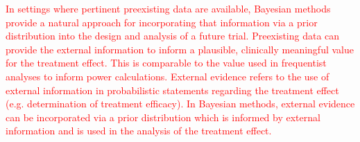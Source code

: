 \documentclass[12pt]{article}
\begin{document}
\textcolor{red}{In settings where pertinent preexisting data are available, Bayesian methods provide a natural approach for incorporating that information via a prior distribution into the design and analysis of a future trial.
%
Preexisting data can provide the external information to inform a plausible, clinically meaningful 
value for the treatment effect.
%
This is comparable to the value used in frequentist analyses to inform power calculations.
%
External evidence refers to the use of external information in probabilistic statements regarding the treatment effect (e.g. determination of treatment efficacy). 
%
In Bayesian methods, external evidence can be incorporated via a prior distribution which is informed by external information and is used in the analysis of the treatment effect.
}

%
\end{document}
